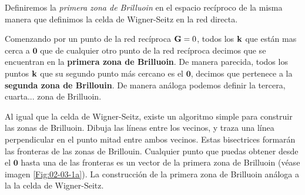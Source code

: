 Definiremos la \textit{primera zona de Brilluoin} en el espacio recíproco de la misma manera que definimos la celda de Wigner-Seitz en la red directa. 

\begin{definition}
	Comenzando por un punto de la red recíproca $\mathbf{G}=0$, todos los $\mathbf{k}$ que están mas cerca a $\mathbf{0}$ que de cualquier otro punto de la red recíproca decimos que se encuentran en la \textbf{primera zona de Brilluoin}. De manera parecida, todos los puntos $\mathbf{k}$ que su segundo punto más cercano es el $\mathbf{0}$, decimos que pertenece a la \textbf{segunda zona de Brillouin}. De manera análoga podemos definir la tercera, cuarta... zona de Brilluoin.  \label{Def:02-05}
\end{definition}

Al igual que la celda de Wigner-Seitz, existe un algoritmo simple para construir las zonas de Brilluoin. Dibuja las líneas entre los vecinos, y traza una línea perpendicular en el punto mitad entre ambos vecinos. Estas bisectrices formarán las fronteras de las zonas de Brillouin. Cualquier punto que puedas obtener desde el $\mathbf{0}$ hasta una de las fronteras es un vector de la primera zona de Brilluoin (véase imagen \ref{Fig:02-03-1a}). La construcción de la primera zona de Brilluoin análoga a la la celda de Wigner-Seitz.

